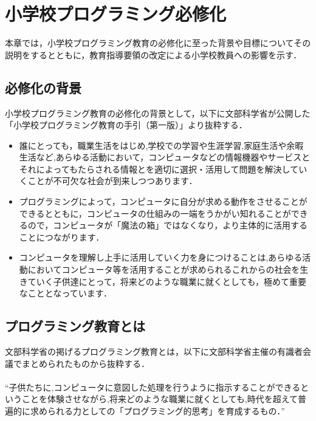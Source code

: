 \newpage

\section{\rm 小学校プログラミング必修化}
本章では，小学校プログラミング教育の必修化に至った背景や目標についてその説明をするとともに，教育指導要領の改定による小学校教員への影響を示す．

\subsection{必修化の背景}
小学校プログラミング教育の必修化の背景として，以下に文部科学省が公開した「小学校プログラミング教育の手引（第一版）」より抜粋する．

\begin{itemize}
 \item 誰にとっても，職業生活をはじめ,学校での学習や生涯学習,家庭生活や余暇生活など,あらゆる活動において，コンピュータなどの情報機器やサービスとそれによってもたらされる情報とを適切に選択・活用して問題を解決していくことが不可欠な社会が到来しつつあります．\\

 \item プログラミングによって，コンピュータに自分が求める動作をさせることができるとともに，コンピュータの仕組みの一端をうかがい知れることができるので，コンピュータが「魔法の箱」ではなくなり，より主体的に活用することにつながります．\\

 \item コンピュータを理解し上手に活用していく力を身につけることは,あらゆる活動においてコンピュータ等を活用することが求められるこれからの社会を生きていく子供達にとって，将来どのような職業に就くとしても，極めて重要なこととなっています．
 \end{itemize}

\subsection{プログラミング教育とは}
文部科学省の掲げるプログラミング教育とは，以下に文部科学省主催の有識者会議でまとめられたものから抜粋する．
\\
\\
``子供たちに,コンピュータに意図した処理を行うように指示することができるということを体験させながら,将来どのような職業に就くとしても,時代を超えて普遍的に求められる力としての「プログラミング的思考」を育成するもの．''\\

